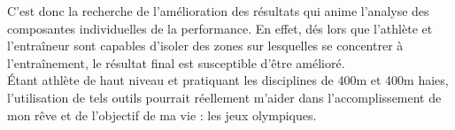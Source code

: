 C'est donc la recherche de l'amélioration des résultats qui anime l'analyse des composantes individuelles de la performance. En effet, dés lors que l'athlète et l'entraîneur sont capables d'isoler des zones sur lesquelles se concentrer à l'entraînement, le résultat final est susceptible d'être amélioré.\\

Étant athlète de haut niveau et pratiquant les disciplines de 400m et 400m haies, l'utilisation de tels outils pourrait réellement m'aider dans l'accomplissement de mon rêve et de l'objectif de ma vie : les jeux olympiques.\\



